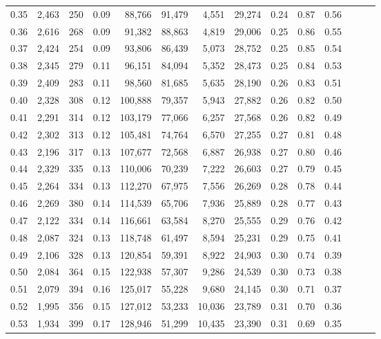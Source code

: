 \begin{tabular}{rrrrrrrrrrrrrr}
0.35 &  2,463 &  250 &  0.09 &   88,766 &   91,479 &   4,551 &  29,274 &  0.24 &  0.87 &      0.56 \\
0.36 &  2,616 &  268 &  0.09 &   91,382 &   88,863 &   4,819 &  29,006 &  0.25 &  0.86 &      0.55 \\
0.37 &  2,424 &  254 &  0.09 &   93,806 &   86,439 &   5,073 &  28,752 &  0.25 &  0.85 &      0.54 \\
0.38 &  2,345 &  279 &  0.11 &   96,151 &   84,094 &   5,352 &  28,473 &  0.25 &  0.84 &      0.53 \\
0.39 &  2,409 &  283 &  0.11 &   98,560 &   81,685 &   5,635 &  28,190 &  0.26 &  0.83 &      0.51 \\
0.40 &  2,328 &  308 &  0.12 &  100,888 &   79,357 &   5,943 &  27,882 &  0.26 &  0.82 &      0.50 \\
0.41 &  2,291 &  314 &  0.12 &  103,179 &   77,066 &   6,257 &  27,568 &  0.26 &  0.82 &      0.49 \\
0.42 &  2,302 &  313 &  0.12 &  105,481 &   74,764 &   6,570 &  27,255 &  0.27 &  0.81 &      0.48 \\
0.43 &  2,196 &  317 &  0.13 &  107,677 &   72,568 &   6,887 &  26,938 &  0.27 &  0.80 &      0.46 \\
0.44 &  2,329 &  335 &  0.13 &  110,006 &   70,239 &   7,222 &  26,603 &  0.27 &  0.79 &      0.45 \\
0.45 &  2,264 &  334 &  0.13 &  112,270 &   67,975 &   7,556 &  26,269 &  0.28 &  0.78 &      0.44 \\
0.46 &  2,269 &  380 &  0.14 &  114,539 &   65,706 &   7,936 &  25,889 &  0.28 &  0.77 &      0.43 \\
0.47 &  2,122 &  334 &  0.14 &  116,661 &   63,584 &   8,270 &  25,555 &  0.29 &  0.76 &      0.42 \\
0.48 &  2,087 &  324 &  0.13 &  118,748 &   61,497 &   8,594 &  25,231 &  0.29 &  0.75 &      0.41 \\
0.49 &  2,106 &  328 &  0.13 &  120,854 &   59,391 &   8,922 &  24,903 &  0.30 &  0.74 &      0.39 \\
0.50 &  2,084 &  364 &  0.15 &  122,938 &   57,307 &   9,286 &  24,539 &  0.30 &  0.73 &      0.38 \\
0.51 &  2,079 &  394 &  0.16 &  125,017 &   55,228 &   9,680 &  24,145 &  0.30 &  0.71 &      0.37 \\
0.52 &  1,995 &  356 &  0.15 &  127,012 &   53,233 &  10,036 &  23,789 &  0.31 &  0.70 &      0.36 \\
0.53 &  1,934 &  399 &  0.17 &  128,946 &   51,299 &  10,435 &  23,390 &  0.31 &  0.69 &      0.35 \\

\end{tabular}
